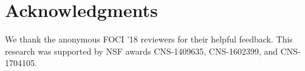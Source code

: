 
\section*{Acknowledgments}
We thank the anonymous FOCI '18 reviewers for their helpful
feedback. This research was supported by NSF awards CNS-1409635,
CNS-1602399, and CNS-1704105.